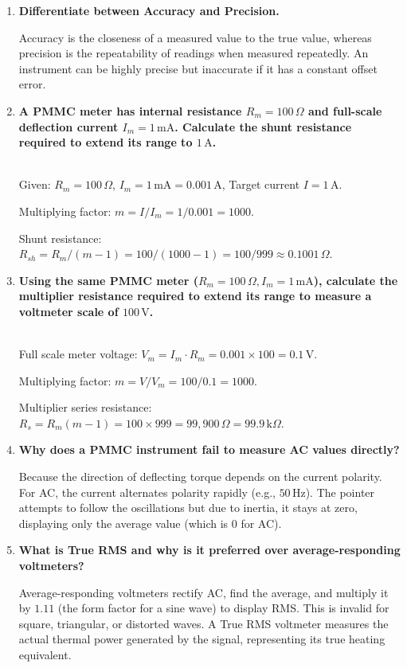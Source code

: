 \documentclass[12pt,a4paper]{article}
\newcommand{\Q}[1]{\textbf{#1}\par\noindent\ignorespaces}
\begin{document}
\begin{tcolorbox}[exambox, title={\textbf{Frequently Asked / Viva Questions}}]
\begin{enumerate}[topsep=0pt, label=\textbf{Q\arabic*.}, itemsep=5pt]
  \item \Q{Differentiate between Accuracy and Precision.}
    Accuracy is the closeness of a measured value to the true value, whereas precision is the repeatability of readings when measured repeatedly. An instrument can be highly precise but inaccurate if it has a constant offset error.
  \item \Q{A PMMC meter has internal resistance $R_m = 100\,\Omega$ and full-scale deflection current $I_m = 1\,\text{mA}$. Calculate the shunt resistance required to extend its range to $1\,\text{A}$.}\\
    Given: $R_m = 100\,\Omega$, $I_m = 1\,\text{mA} = 0.001\,\text{A}$, Target current $I = 1\,\text{A}$.\par
    Multiplying factor: $m = I / I_m = 1 / 0.001 = 1000$.\par
    Shunt resistance: $R_{sh} = R_m / (m - 1) = 100 / (1000 - 1) = 100 / 999 \approx 0.1001\,\Omega$.
  \item \Q{Using the same PMMC meter ($R_m=100\,\Omega, I_m=1\,\text{mA}$), calculate the multiplier resistance required to extend its range to measure a voltmeter scale of $100\,\text{V}$.}\\
    Full scale meter voltage: $V_m = I_m \cdot R_m = 0.001 \times 100 = 0.1\,\text{V}$.\par
    Multiplying factor: $m = V / V_m = 100 / 0.1 = 1000$.\par
    Multiplier series resistance: $R_s = R_m(m - 1) = 100 \times 999 = 99,900\,\Omega = 99.9\,\text{k}\Omega$.
  \item \Q{Why does a PMMC instrument fail to measure AC values directly?}
    Because the direction of deflecting torque depends on the current polarity. For AC, the current alternates polarity rapidly (e.g., $50\,\text{Hz}$). The pointer attempts to follow the oscillations but due to inertia, it stays at zero, displaying only the average value (which is 0 for AC).
  \item \Q{What is True RMS and why is it preferred over average-responding voltmeters?}
    Average-responding voltmeters rectify AC, find the average, and multiply it by $1.11$ (the form factor for a sine wave) to display RMS. This is invalid for square, triangular, or distorted waves. A True RMS voltmeter measures the actual thermal power generated by the signal, representing its true heating equivalent.

\end{enumerate}
\end{tcolorbox}
\end{document}
